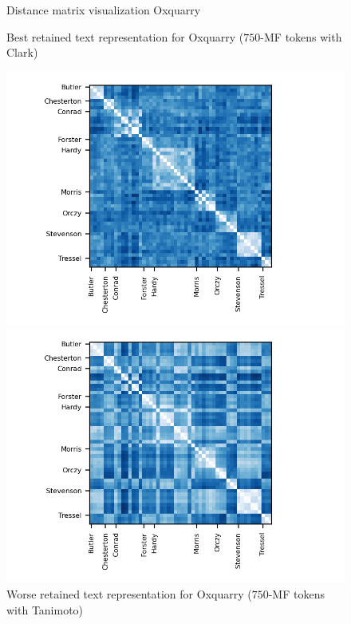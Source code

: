 \begin{figure}
  \caption{Distance matrix visualization Oxquarry}
  \label{fig:distances_matrix_oxquarry}

  \caption{Best retained text representation for Oxquarry ($750$-MF tokens with Clark)}
  \label{fig:distance_matrix_oxquarry_clark}
  \includegraphics{img/distance_matrix_oxquarry_clark.png}

  \vspace{0.5cm}

  \caption{Worse retained text representation for Oxquarry ($750$-MF tokens with Tanimoto)}
  \label{fig:distance_matrix_oxquarry_tanimoto}
  \includegraphics{img/distance_matrix_oxquarry_tanimoto.png}
\end{figure}

